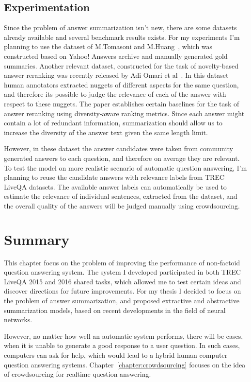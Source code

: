 \subsection{Experimentation}
\label{section:non-factoid:proposal:experiments}

Since the problem of answer summarization isn't new, there are some datasets already available and several benchmark results exists.
For my experiments I'm planning to use the dataset of M.Tomasoni and M.Huang~\cite{tomasoni2010metadata}, which was constructed based on Yahoo! Answers archive and manually generated gold summaries.
Another relevant dataset, constructed for the task of novelty-based answer reranking was recently released by Adi Omari et al~\cite{omari2016novelty}.
In this dataset human annotators extracted nuggets of different aspects for the same question, and therefore its possible to judge the relevance of each of the answer with respect to these nuggets.
The paper establishes certain baselines for the task of answer reranking using diversity-aware ranking metrics.
Since each answer might contain a lot of redundant information, summarization should allow us to increase the diversity of the answer text given the same length limit.

However, in these dataset the answer candidates were taken from community generated answers to each question, and therefore on average they are relevant.
To test the model on more realistic scenario of automatic question answering, I'm planning to reuse the candidate answers with relevance labels from TREC LiveQA datasets.
The available answer labels can automatically be used to estimate the relevance of individual sentences, extracted from the dataset, and the overall quality of the answers will be judged manually using crowdsourcing.

\section{Summary}
\label{section:non-factoid:summary}

This chapter focus on the problem of improving the performance of non-factoid question answering system.
The system I developed participated in both TREC LiveQA 2015 and 2016 shared tasks, which allowed me to test certain ideas and discover directions for future improvements.
For my thesis I decided to focus on the problem of answer summarization, and proposed extractive and abstractive summarization models, based on recent developments in the field of neural networks.

However, no matter how well an automatic system performs, there will be cases, when it is unable to generate a good response to a user question.
In such cases, computers can ask for help, which would lead to a hybrid human-computer question answering systems.
Chapter~\ref{chapter:crowdsourcing} focuses on the idea of crowdsourcing for realtime question answering.